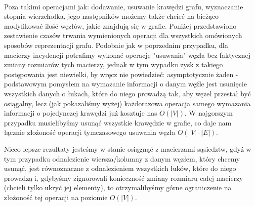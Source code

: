 ~

Poza takimi operacjami jak: dodawanie, usuwanie krawędzi grafu, wyznaczanie stopnia wierzchołka, jego następników możemy także chcieć na bieżąco modyfikować ilość węzłów, jakie znajdują się w grafie. Poniżej przedstawiono zestawienie czasów trwania wymienionych operacji dla wszystkich omówionych sposobów reprezentacji grafu. Podobnie jak w poprzednim przypadku, dla macierzy incydencji potrafimy wykonać operację "usuwania" węzła bez faktycznej zmiany rozmiarów tych macierzy, jednak w tym wypadku zysk z takiego postępowania jest niewielki, by wręcz nie powiedzieć: asymptotycznie żaden - podstawowym pomysłem na wymazanie informacji o danym węźle jest usunięcie wszystkich danych o łukach, które do niego prowadzą tak, aby węzeł przestał być osiągalny, lecz (jak pokazaliśmy wyżej) każdorazowa operacja samego wymazania informacji o pojedynczej krawędzi już kosztuje nas $O \left( \left| V \right| \right) $. W najgorszym przypadku musielibyśmy usunąć wszystkie krawędzie w grafie, co daje nam łącznie złożoność operacji tymczasowego usuwania węzła $O \left( \left| V \right| \cdot  \left| E \right| \right) $. 

Nieco lepsze rezultaty jesteśmy w stanie osiągnąć z macierzami sąsiedztw, gdyż w tym przypadku odnalezienie wiersza/kolumny z danym węzłem, który chcemy usunąć, jest równoznaczne z odnalezieniem wszystkich łuków, które do niego prowadzą i, gdybyśmy zignorowali konieczność zmiany rozmiaru całej macierzy (chcieli tylko ukryć jej elementy), to otrzymalibyśmy górne ograniczenie na złożoność tej operacji na poziomie $ O \left( \left| V \right| \right)$.

